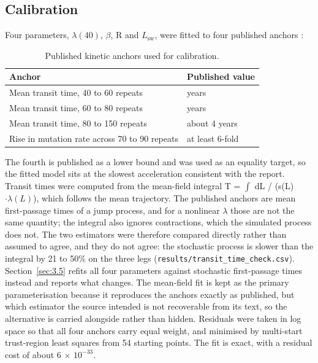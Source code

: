 \documentclass[conference]{IEEEtran}
\newlength{\colw}
\begin{document}
\subsection{Calibration}
\label{sec:2.3}
Four parameters, $\lambda(40)$, $\beta$, R and $L_{\mathrm{sw}}$, were fitted to four published anchors \cite{handsaker}:

\begin{table}[!t]
\caption{Published kinetic anchors used for calibration.}
\label{tab:1}
\centering
\footnotesize
\setlength{\colw}{\dimexpr\columnwidth-4\tabcolsep\relax}
\begin{tabular}{>{\raggedright\arraybackslash}p{0.750\colw}>{\raggedright\arraybackslash}p{0.250\colw}}
\toprule
\textbf{Anchor} & \textbf{Published value} \\
\midrule
Mean transit time, 40 to 60 repeats & 50 years \\
Mean transit time, 60 to 80 repeats & 12 years \\
Mean transit time, 80 to 150 repeats & about 4 years \\
Rise in mutation rate across 70 to 90 repeats & at least 6-fold \\
\bottomrule
\end{tabular}
\end{table}

The fourth is published as a lower bound and was used as an equality target, so the fitted model sits at the slowest acceleration consistent with the report. Transit times were computed from the mean-field integral T = $\int$ dL / (s(L)$\cdot\lambda(L)$), which follows the mean trajectory. The published anchors are mean first-passage times of a jump process, and for a nonlinear $\lambda$ those are not the same quantity; the integral also ignores contractions, which the simulated process does not. The two estimators were therefore compared directly rather than assumed to agree, and they do not agree: the stochastic process is slower than the integral by 21 to 50\% on the three legs (\texttt{results/\allowbreak{}transit\_\allowbreak{}time\_\allowbreak{}check.\allowbreak{}csv}). Section~\ref{sec:3.5} refits all four parameters against stochastic first-passage times instead and reports what changes. The mean-field fit is kept as the primary parameterisation because it reproduces the anchors exactly as published, but which estimator the source intended is not recoverable from its text, so the alternative is carried alongside rather than hidden. Residuals were taken in log space so that all four anchors carry equal weight, and minimised by multi-start trust-region least squares from 54 starting points. The fit is exact, with a residual cost of about 6 $\times$ $10^{-33}$.
\end{document}
